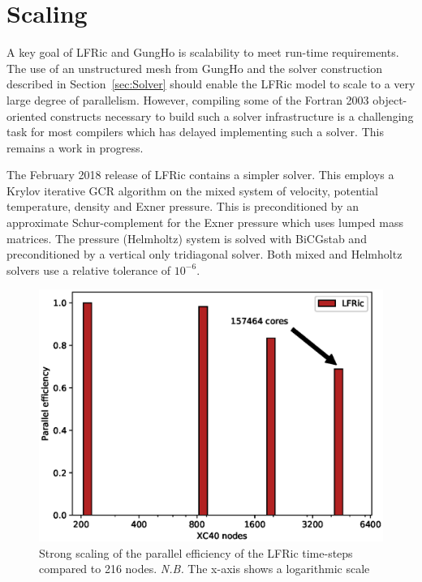 \documentclass[review,times]{elsarticle}
\begin{document}
\section{\label{sec:scal}Scaling}

A key goal of 
LFRic and GungHo is scalability to meet run-time requirements. The use of an unstructured mesh from
GungHo and the solver construction described in
Section~\ref{sec:Solver} should enable the LFRic model to scale to a
very large degree of parallelism. However, compiling some of the
Fortran 2003 object-oriented constructs necessary to build such a solver
infrastructure is a challenging task for most compilers which has
delayed implementing such a solver. This remains a work in progress.

The February 2018 release of LFRic contains a simpler
solver. This employs a Krylov iterative GCR algorithm on the mixed
system of velocity, potential temperature, density and Exner
pressure. This is preconditioned by an approximate Schur-complement
for the Exner pressure which uses lumped mass matrices. The pressure
(Helmholtz) system is solved with BiCGstab and preconditioned by a
vertical only tridiagonal solver. Both mixed and Helmholtz solvers use
a relative tolerance of $10^{-6}$.

\begin{figure}
  \begin{center}
    \includegraphics[width=0.85\linewidth]{Fig7_scale.eps}
    \caption{\label{fig:scale_PE}Strong scaling of the parallel efficiency of the LFRic 
      time-steps compared to 216 nodes. {\em N.B.} The x-axis shows a
      logarithmic scale}
  \end{center}
\end{figure}
\end{document}
